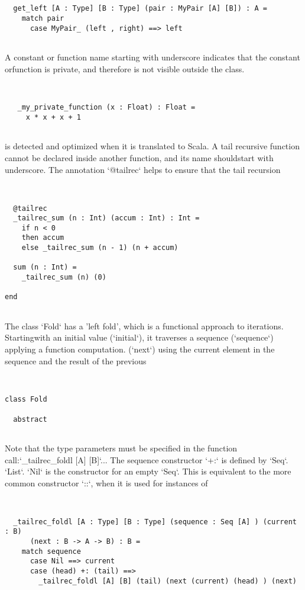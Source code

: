 \documentclass[12pt,a4paper]{article}
\begin{document}
\begin{lstlisting}


  get_left [A : Type] [B : Type] (pair : MyPair [A] [B]) : A =
    match pair
      case MyPair_ (left , right) ==> left


\end{lstlisting}

A constant or function name starting with underscore indicates that the constant orfunction is private, and therefore is not visible outside the class. 


\begin{lstlisting}


   _my_private_function (x : Float) : Float =
     x * x + x + 1


\end{lstlisting}

is detected and optimized when it is translated to Scala. A tail recursive function cannot be declared inside another function, and its name shouldstart with underscore. The annotation `@tailrec` helps to ensure that the tail recursion


\begin{lstlisting}


  @tailrec
  _tailrec_sum (n : Int) (accum : Int) : Int =
    if n < 0
    then accum
    else _tailrec_sum (n - 1) (n + accum)

  sum (n : Int) =
    _tailrec_sum (n) (0)

end


\end{lstlisting}

The class `Fold` has a 'left fold', which is a functional approach to iterations. Startingwith an initial value (`initial`), it traverses a sequence (`sequence`) applying a function
computation. (`next`) using the current element in the sequence and the result of the previous


\begin{lstlisting}


class Fold

  abstract


\end{lstlisting}

Note that the type parameters must be specified in the function call:`_tailrec_foldl [A] [B]`...
The sequence constructor `+:` is defined by `Seq`.
`List`. `Nil` is the constructor for an empty `Seq`. This is equivalent to the more common constructor `::`, when it is used for instances of


\begin{lstlisting}


  _tailrec_foldl [A : Type] [B : Type] (sequence : Seq [A] ) (current : B)
      (next : B -> A -> B) : B =
    match sequence
      case Nil ==> current
      case (head) +: (tail) ==>
        _tailrec_foldl [A] [B] (tail) (next (current) (head) ) (next)


\end{lstlisting}
\end{document}

